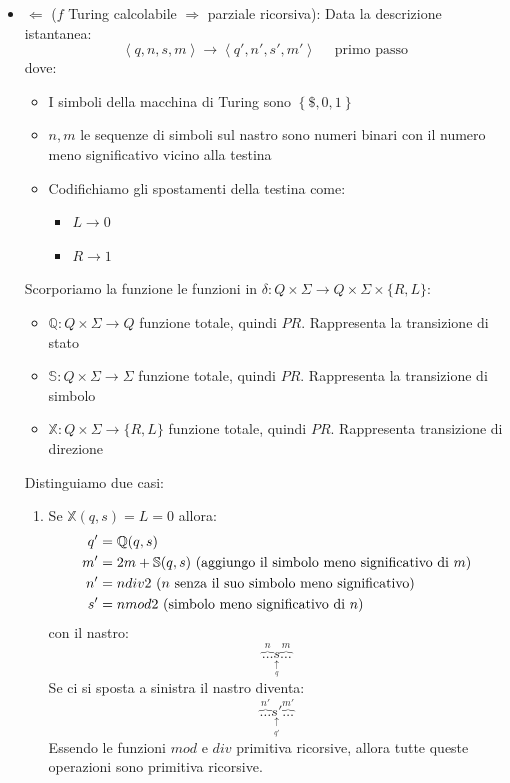 \documentclass[a4paper]{article}
\begin{document}
\begin{theorem}
\begin{itemize}
  \item \( \Leftarrow \) (\( f \) Turing calcolabile \( \Rightarrow \) parziale ricorsiva):
    Data la descrizione istantanea:
    \[
      \left<q, n, s, m \right> \to \left<q', n', s', m' \right> \quad \text{ primo passo}
    \] 
    dove:
    \begin{itemize}
      \item I simboli della macchina di Turing sono \( \left\{ \$, 0, 1 \right\} \)
      \item \( n, m \) le sequenze di simboli sul nastro sono numeri binari con il
        numero meno significativo vicino alla testina
      \item Codifichiamo gli spostamenti della testina come:
        \begin{itemize}
          \item \( L \to 0 \)
          \item \( R \to 1 \)
        \end{itemize}
    \end{itemize}
    Scorporiamo la funzione le funzioni in
    \( \delta: Q \times \Sigma \to Q \times \Sigma \times \{ R, L\}  \):
    \begin{itemize}
      \item \( \mathbb{Q}: Q \times \Sigma \to Q \) funzione totale, quindi \( PR \). Rappresenta la 
        transizione di stato
      \item \( \mathbb{S}: Q \times \Sigma \to \Sigma  \) funzione totale, quindi \( PR \).
        Rappresenta la transizione di simbolo
      \item \( \mathbb{X}: Q \times \Sigma \to \{R, L\}  \) funzione totale, quindi \( PR \).
        Rappresenta transizione di direzione
    \end{itemize}
    Distinguiamo due casi:
    \begin{enumerate}
      \item Se \( \mathbb{X}(q,s) = L = 0 \) allora:
        \[
          \begin{aligned}
            q' &= \mathbb{Q}(q,s)\\
            m' &= 2m + \mathbb{S}(q,s) \text{ (aggiungo il simbolo meno significativo di \( m \))} \\
            n' &= n div 2 \text{ (\( n \) senza il suo simbolo meno significativo)} \\
            s' &= n mod 2 \text{ (simbolo meno significativo di \( n \))}
          \end{aligned}
        \] 
        con il nastro:
        \[
          \overbrace{\ldots}^n \underset{\underset{q}{\uparrow}}{s} \overbrace{\ldots}^{m}
        \] 
        Se ci si sposta a sinistra il nastro diventa:
        \[
          \overbrace{\ldots}^{n'} \underset{\underset{q'}{\uparrow}}{s'} \overbrace{\ldots}^{m'}
        \] 
        Essendo le funzioni \( mod \) e \( div \) primitiva ricorsive, allora tutte
        queste operazioni sono primitiva ricorsive.


\end{enumerate}
\end{itemize}
\end{theorem}
\end{document}
